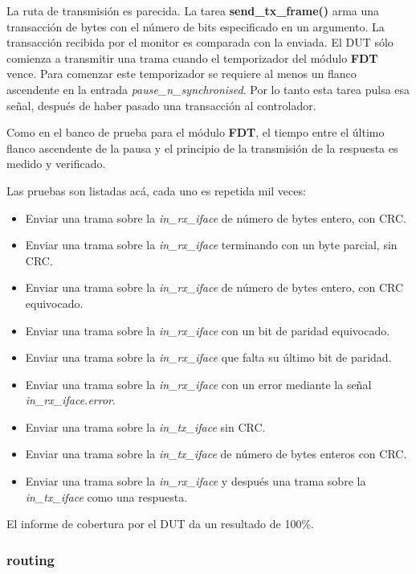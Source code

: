 \documentclass[a4paper, twoside, 11pt]{report}
\begin{document}
La ruta de transmisión es parecida. La tarea \textbf{send\_tx\_frame()} arma una transacción de bytes con el número de bits especificado en un argumento. La transacción recibida por el monitor es comparada con la enviada. El DUT sólo comienza a transmitir una trama cuando el temporizador del módulo \textbf{FDT} vence. Para comenzar este temporizador se requiere al menos un flanco ascendente en la entrada \textit{pause\_n\_synchronised}. Por lo tanto esta tarea pulsa esa señal, después de haber pasado una transacción al controlador.

Como en el banco de prueba para el módulo \textbf{FDT}, el tiempo entre el último flanco ascendente de la pausa y el principio de la transmisión de la respuesta es medido y verificado.

Las pruebas son listadas acá, cada uno es repetida mil veces:

\begin{itemize}
  \item Enviar una trama sobre la \textit{in\_rx\_iface} de número de bytes entero, con CRC.
  \item Enviar una trama sobre la \textit{in\_rx\_iface} terminando con un byte parcial, sin CRC.
  \item Enviar una trama sobre la \textit{in\_rx\_iface} de número de bytes entero, con CRC equivocado.
  \item Enviar una trama sobre la \textit{in\_rx\_iface} con un bit de paridad equivocado.
  \item Enviar una trama sobre la \textit{in\_rx\_iface} que falta su último bit de paridad.
  \item Enviar una trama sobre la \textit{in\_rx\_iface} con un error mediante la señal \textit{in\_rx\_iface.error}.
  \item Enviar una trama sobre la \textit{in\_tx\_iface} sin CRC.
  \item Enviar una trama sobre la \textit{in\_tx\_iface} de número de bytes enteros con CRC.
  \item Enviar una trama sobre la \textit{in\_rx\_iface} y después una trama sobre la \textit{in\_tx\_iface} como una respuesta.
\end{itemize}

El informe de cobertura por el DUT da un resultado de 100\%.

\FloatBarrier
\subsubsection{routing}
\end{document}
